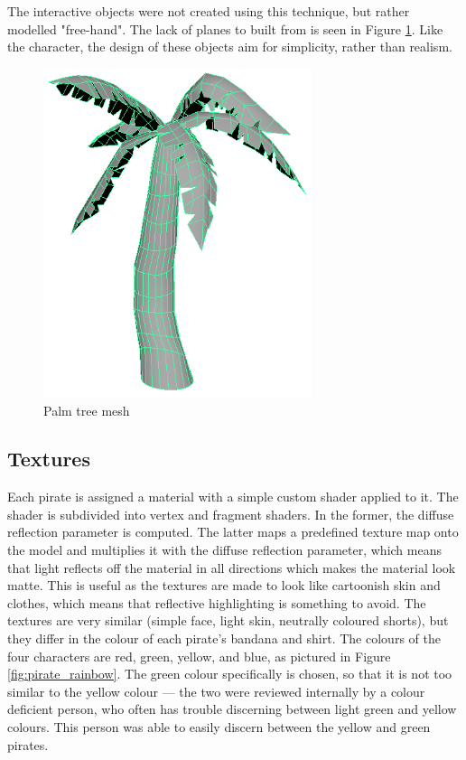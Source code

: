 The interactive objects were not created using this technique, but rather modelled "free-hand". The lack of planes to built from is seen in Figure \ref{fig:palmtree_mesh}. Like the character, the design of these objects aim for simplicity, rather than realism.

\begin{figure}[h!]
	\centering
	\includegraphics[width=0.7\textwidth]{figures/palmtree_mesh.png}
	\caption{Palm tree mesh \label{fig:palmtree_mesh}}
\end{figure}

\subsection{Textures}
Each pirate is assigned a material with a simple custom shader applied to it. The shader is subdivided into vertex and fragment shaders. In the former, the diffuse reflection parameter is computed. The latter maps a predefined texture map onto the model and multiplies it with the diffuse reflection parameter, which means that light reflects off the material in all directions which makes the material look matte. This is useful as the textures are made to look like cartoonish skin and clothes, which means that reflective highlighting is something to avoid. The textures are very similar (simple face, light skin, neutrally coloured shorts), but they differ in the colour of each pirate's bandana and shirt. The colours of the four characters are red, green, yellow, and blue, as pictured in Figure \ref{fig:pirate_rainbow}. The green colour specifically is chosen, so that it is not too similar to the yellow colour --- the two were reviewed internally by a colour deficient person, who often has trouble discerning between light green and yellow colours. This person was able to easily discern between the yellow and green pirates.

